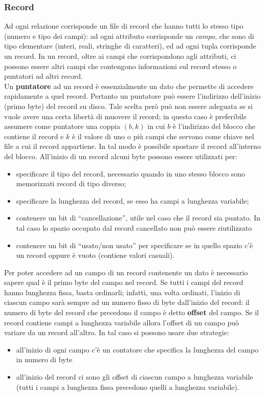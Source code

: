 \subsubsection{Record}
Ad ogni relazione corrisponde un file di record che hanno tutti lo stesso tipo (numero e 
tipo dei campi): ad ogni attributo corrisponde un \emph{campo}, che sono di tipo elementare (interi,
reali, stringhe di caratteri), ed ad ogni tupla corrisponde un record. In un record, oltre ai campi 
che corrispondono agli attributi, ci possono essere altri campi che contengono informazioni sul 
record stesso o puntatori ad altri record.\\
Un \textbf{puntatore} ad un record è essenzialmente un dato che permette di accedere rapidamente a quel
record. Pertanto un puntatore può essere l'indirizzo dell'inizio (primo byte) del record su disco.
Tale scelta però può non essere adeguata se si vuole avere una certa libertà di muovere il record; in
questo caso è preferibile assumere come puntatore una coppia $(b, k)$ in cui $b$ è l'indirizzo del blocco
che contiene il record e $k$ è il valore di uno o più campi che servono come chiave nel file a cui il
record appartiene. In tal modo è possibile spostare il record all'interno del blocco. All'inizio di un 
record alcuni byte possono essere utilizzati per:
\begin{itemize}
 \item specificare il tipo del record, necessario quando in uno stesso blocco sono memorizzati 
 record di tipo diverso;
 \item specificare la lunghezza del record, se esso ha campi a lunghezza variabile;
 \item contenere un bit di ``cancellazione'', utile nel caso che il record sia puntato. In tal caso 
 lo spazio occupato dal record cancellato non può essere riutilizzato
 \item contenere un bit di ``usato/non usato'' per specificare se in quello spazio c'è un record oppure
 è vuoto (contiene valori casuali).
\end{itemize}

Per poter accedere ad un campo di un record contenente un dato è necessario sapere qual è il primo
byte del campo nel record. Se tutti i campi del record hanno lunghezza fissa, basta ordinarli; infatti,
una volta ordinati, l'inizio di ciascun campo sarà sempre ad un numero fisso di byte dall'inizio del
record: il numero di byte del record che precedono il campo è detto \textbf{offset} del campo. Se il record
contiene campi a lunghezza variabile allora l'offset di un campo può variare da un record all'altro.
In tal caso si possono usare due strategie:
\begin{itemize}
 \item all'inizio di ogni campo c'è un contatore che specifica la lunghezza del campo in numero di
byte
\item all'inizio del record ci sono gli offset di ciascun campo a lunghezza variabile (tutti i campi 
a lunghezza fissa precedono quelli a lunghezza variabile).
\end{itemize}

